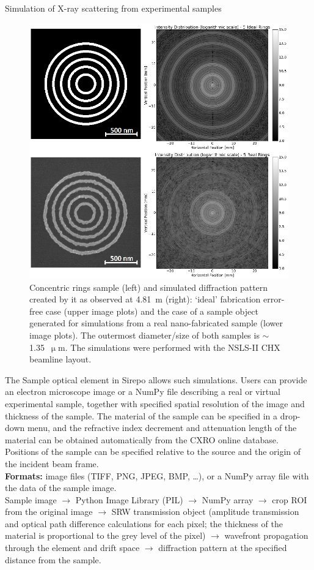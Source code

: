 \documentclass[final]{beamer}
\newlength{\onecolwid}
\begin{document}
\begin{frame}[t]
\begin{columns}[t]
\begin{column}{\onecolwid}
\begin{block}{\faSpinner{} Simulation of X-ray scattering from experimental samples}
\begin{figure}
\includegraphics[width=0.8\linewidth]{images/samples_patterns.png}
\caption{Concentric rings sample (left) and simulated diffraction pattern 
created by it as observed at 4.81~m (right): `ideal' fabrication error-free case
(upper image plots) and the case of a sample object generated for simulations
from a real nano-fabricated sample (lower image plots). The outermost 
diameter/size of both samples is $\sim$1.35~$\upmu$m. The simulations were
performed with the NSLS-II CHX beamline layout.}
\end{figure}


The Sample optical element in Sirepo allows such simulations. Users can provide
an electron microscope image or a NumPy file describing a real or virtual
experimental sample, together with specified spatial resolution of the image and
thickness of the sample. The material of the sample can be specified in a
drop-down menu, and the refractive index decrement and attenuation length of the
material can be obtained automatically from the CXRO online database. Positions
of the sample can be specified relative to the source and the origin of the
incident beam frame.
\newline
\\
\textbf{Formats:}  image files (TIFF, PNG, JPEG, BMP, \ldots), or a NumPy array
file with the data of the sample image.
\newline
\\
Sample image $\rightarrow$ Python Image Library (PIL) $\rightarrow$ NumPy array
$\rightarrow$ crop ROI from the original image $\rightarrow$ SRW transmission
object (amplitude transmission and optical path difference calculations for each
pixel; the thickness of the material is proportional to the grey level of the
pixel) $\rightarrow$ wavefront propagation through the element and
drift space $\rightarrow$  diffraction pattern at the specified distance from
the sample.


\end{block}
\end{column}
\end{columns}
\end{frame}
\end{document}
